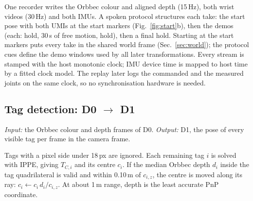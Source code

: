\documentclass[conference,10pt]{IEEEtran}
\begin{document}
One recorder writes the Orbbec colour and aligned depth (15\,Hz), both wrist videos (30\,Hz) and both IMUs. A spoken
protocol structures each take: the start pose with both UMIs at the start markers (Fig.~\ref{fig:start}b), then the
demos (each: hold, 30\,s of free motion, hold), then a final hold. Starting at the start markers puts every take in the
shared world frame (Sec.~\ref{sec:world}); the protocol cues define the demo windows used by all later transformations.
Every stream is stamped with the host monotonic clock; IMU device time is mapped to host time by a fitted clock model.
The replay later logs the commanded and the measured joints on the same clock, so no synchronisation hardware is needed.

\subsection{Tag detection: D0 $\to$ D1}\label{sec:tagdet}
\emph{Input:} the Orbbec colour and depth frames of D0. \emph{Output:} D1, the pose of every visible tag per frame in the
camera frame.

Tags with a pixel side under 18\,px are ignored. Each remaining tag $i$ is solved with IPPE, giving $T_{C,i}$ and its
centre $c_i$. If the median Orbbec depth $d_i$ inside the tag quadrilateral is valid and within 0.10\,m of $c_{i,z}$, the
centre is moved along its ray: $c_i\leftarrow c_i\,d_i/c_{i,z}$. At about 1\,m range, depth is the least accurate PnP coordinate.
\end{document}

